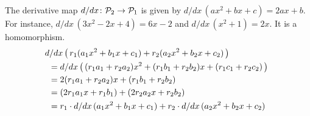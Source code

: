 \documentclass[10pt,t,serif,professionalfont]{beamer}
\begin{document}
\begin{frame}
\ex
The derivative map $\mbox{$d/dx\colon \mathcal{P}_2\to \mathcal{P}_1$}$
is given by $d/dx\,(ax^2+bx+c)=2ax+b$.
For instance, $d/dx\,(3x^2-2x+4)=6x-2$
and $d/dx\,(x^2+1)=2x$.
\pause
It is a homomorphism.
\begin{multline*}
  d/dx\,\big(\,r_1(a_1x^2+b_1x+c_1)+r_2(a_2x^2+b_2x+c_2)\,\big)  \hspace*{5em}  \\
  \begin{aligned} 
    &=d/dx\,\big(\,(r_1a_1+r_2a_2)x^2+(r_1b_1+r_2b_2)x+(r_1c_1+r_2c_2)\,\big)   \\
    &=2(r_1a_1+r_2a_2)x+(r_1b_1+r_2b_2)   \\
    &=(2r_1a_1x+r_1b_1)+(2r_2a_2x+r_2b_2)   \\
    &=r_1\cdot d/dx\,(a_1x^2+b_1x+c_1)
      +r_2\cdot d/dx\,(a_2x^2+b_2x+c_2)
  \end{aligned}
\end{multline*}
\end{frame}
\end{document}
